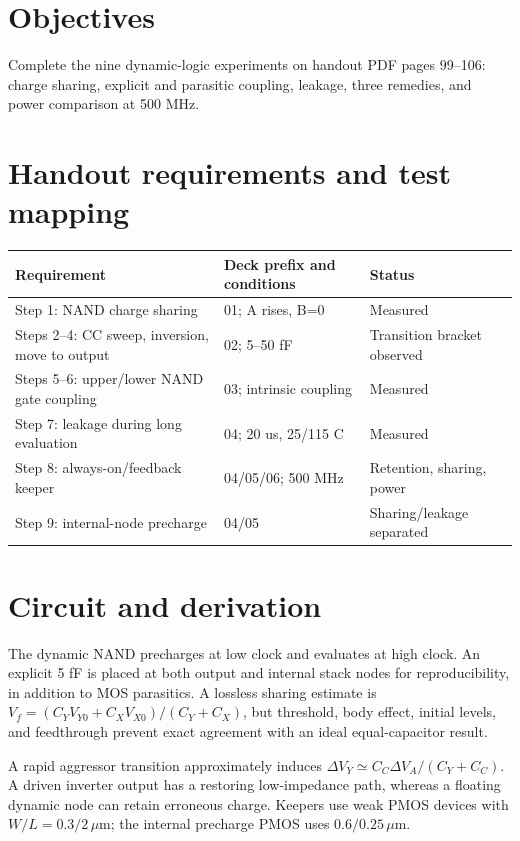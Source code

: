 \section{Objectives}

Complete the nine dynamic-logic experiments on handout PDF pages 99--106: charge sharing, explicit and parasitic coupling, leakage, three remedies, and power comparison at 500 MHz.

\section{Handout requirements and test mapping}

\begin{center}
\small
\setlength{\tabcolsep}{4pt}
\begin{tabular}{p{.42\linewidth}p{.29\linewidth}p{.18\linewidth}}
\toprule
Requirement & Deck prefix and conditions & Status \\
\midrule
Step 1: NAND charge sharing & 01; A rises, B=0 & Measured \\
Steps 2--4: CC sweep, inversion, move to output & 02; 5--50 fF & Transition bracket observed \\
Steps 5--6: upper/lower NAND gate coupling & 03; intrinsic coupling & Measured \\
Step 7: leakage during long evaluation & 04; 20 us, 25/115 C & Measured \\
Step 8: always-on/feedback keeper & 04/05/06; 500 MHz & Retention, sharing, power \\
Step 9: internal-node precharge & 04/05 & Sharing/leakage separated \\
\bottomrule
\end{tabular}
\end{center}

\section{Circuit and derivation}

The dynamic NAND precharges at low clock and evaluates at high clock. An explicit 5 fF is placed at both output and internal stack nodes for reproducibility, in addition to MOS parasitics. A lossless sharing estimate is $V_f=(C_YV_{Y0}+C_XV_{X0})/(C_Y+C_X)$, but threshold, body effect, initial levels, and feedthrough prevent exact agreement with an ideal equal-capacitor result.

A rapid aggressor transition approximately induces $\Delta V_Y\simeq C_C\Delta V_A/(C_Y+C_C)$. A driven inverter output has a restoring low-impedance path, whereas a floating dynamic node can retain erroneous charge. Keepers use weak PMOS devices with $W/L=0.3/2\,\mu\mathrm m$; the internal precharge PMOS uses $0.6/0.25\,\mu\mathrm m$.

